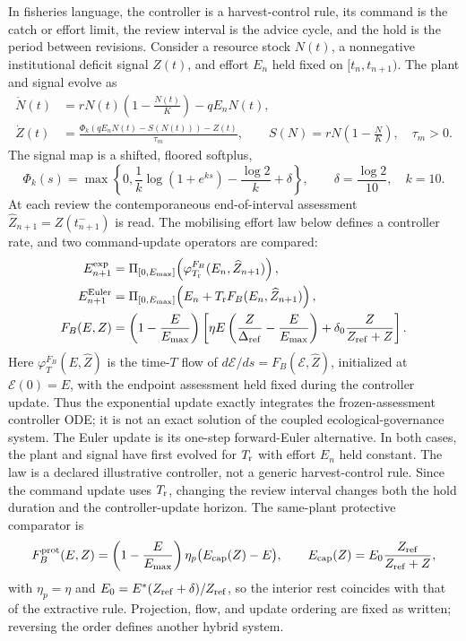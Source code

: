 In fisheries language, the controller is a harvest-control rule, its command is the catch or effort limit, the review interval is the advice cycle, and the hold is the period between revisions. Consider a resource stock \(N(t)\), a nonnegative institutional deficit signal \(Z(t)\), and effort \(E_n\) held fixed on \([t_n,t_{n+1})\). The plant and signal evolve as
\begin{align}
\dot N(t)&=rN(t)\left(1-\frac{N(t)}{K}\right)-qE_nN(t),\label{eq:plant}\\
\dot Z(t)&=\frac{\Phi_k\!\left(qE_nN(t)-S(N(t))\right)-Z(t)}{\tau_m},\qquad
S(N)=rN\left(1-\frac{N}{K}\right),\quad \tau_m>0.\label{eq:signal}
\end{align}
The signal map is a shifted, floored softplus,
\[
\Phi_k(s)=\max\!\left\{0,\frac{1}{k}\log(1+e^{ks})-\frac{\log 2}{k}+\delta\right\},
\qquad \delta=\frac{\log 2}{10},\quad k=10.
\]
At each review the contemporaneous end-of-interval assessment \(\widehat Z_{n+1}=Z(t_{n+1}^{-})\) is read. The mobilising effort law below defines a controller rate, and two command-update operators are compared:
\begin{align}
E_{n+1}^{\rm exp}&=\Pi_{[0,E_{\max}]}\!\left(\varphi_{T_{\mathrm r}}^{F_B}(E_n,\widehat Z_{n+1})\right),\label{eq:review-exp}\\
E_{n+1}^{\rm Euler}&=\Pi_{[0,E_{\max}]}\!\left(E_n+T_{\mathrm r} F_B(E_n,\widehat Z_{n+1})\right),\label{eq:review}\\
F_B(E,Z)&=\left(1-\frac{E}{E_{\max}}\right)
\left[\eta E\left(\frac{Z}{\Delta_{\rm ref}}-\frac{E}{E_{\max}}\right)
+\delta_0\frac{Z}{Z_{\rm ref}+Z}\right].\label{eq:effort}
\end{align}
Here \(\varphi_T^{F_B}(E,\widehat Z)\) is the time-\(T\) flow of \(d\mathcal E/ds=F_B(\mathcal E,\widehat Z)\), initialized at \(\mathcal E(0)=E\), with the endpoint assessment held fixed during the controller update. Thus the exponential update exactly integrates the frozen-assessment controller ODE; it is not an exact solution of the coupled ecological-governance system. The Euler update is its one-step forward-Euler alternative. In both cases, the plant and signal have first evolved for \(T_{\mathrm r}\) with effort \(E_n\) held constant. The law is a declared illustrative controller, not a generic harvest-control rule. Since the command update uses \(T_{\mathrm r}\), changing the review interval changes both the hold duration and the controller-update horizon. The same-plant protective comparator is
\[
F_B^{\rm prot}(E,Z)=\left(1-\frac{E}{E_{\max}}\right)\eta_p\bigl(E_{\rm cap}(Z)-E\bigr),\qquad
E_{\rm cap}(Z)=E_0\frac{Z_{\rm ref}}{Z_{\rm ref}+Z},
\]
with \(\eta_p=\eta\) and \(E_0=E^*(Z_{\rm ref}+\delta)/Z_{\rm ref}\), so the interior rest coincides with that of the extractive rule. Projection, flow, and update ordering are fixed as written; reversing the order defines another hybrid system.

